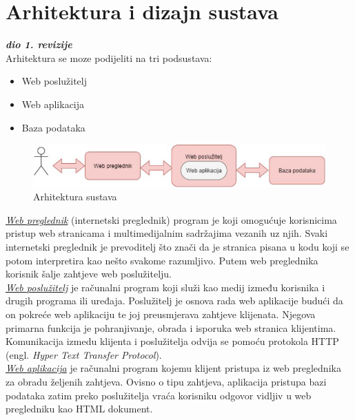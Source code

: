 \chapter{Arhitektura i dizajn sustava}
		
		\textbf{\textit{dio 1. revizije}}\\

		\noindent Arhitektura se moze podijeliti na tri podsustava: 
		\begin{itemize}
			\item Web poslužitelj
			\item Web aplikacija
			\item Baza podataka
		\end{itemize}
	
		\begin{figure}[H]
			\includegraphics[width=.9\linewidth]{slike/arhitektura_sustava.png}
			\centering
			\caption{Arhitektura sustava}
			\label{fig:arh1}
		\end{figure}

		\indent \underline{\textit{Web preglednik}} (internetski preglednik) program je koji omogućuje korisnicima pristup web stranicama i multimedijalnim sadržajima vezanih uz njih. Svaki internetski preglednik je prevoditelj što znači da je stranica pisana u kodu koji se potom interpretira kao nešto svakome razumljivo. Putem web preglednika korisnik šalje zahtjeve web poslužitelju. \\
		\indent \underline{\textit{Web poslužitelj}} je računalni program koji služi kao medij između korisnika i drugih programa ili uređaja. Poslužitelj je osnova rada web aplikacije budući da on pokreće web aplikaciju te joj preusmjerava zahtjeve klijenata. Njegova primarna funkcija je pohranjivanje, obrada i isporuka web stranica klijentima. Komunikacija izmedu klijenta i poslužitelja odvija se pomoću protokola HTTP (engl. \textit{Hyper Text Transfer Protocol}).\\
		\indent \underline{\textit{Web aplikacija}} je računalni program kojemu klijent pristupa iz web preglednika za obradu željenih zahtjeva. Ovisno o tipu zahtjeva, aplikacija pristupa bazi podataka zatim preko poslužitelja vraća korisniku odgovor vidljiv u web pregledniku kao HTML dokument.\\
		
